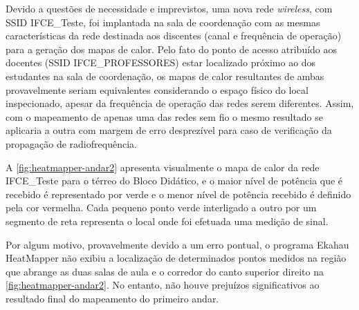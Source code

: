 Devido a questões de necessidade e imprevistos, uma nova rede \textit{wireless}, com SSID IFCE\_Teste, foi implantada na sala de coordenação com as mesmas características da rede destinada aos discentes (canal e frequência de operação) para a geração dos mapas de calor. Pelo fato do ponto de acesso atribuído aos docentes (SSID IFCE\_PROFESSORES) estar localizado próximo ao dos estudantes na sala de coordenação, os mapas de calor resultantes de ambas provavelmente seriam equivalentes considerando o espaço físico do local inspecionado, apesar da frequência de operação das redes serem diferentes. Assim,  com o mapeamento de apenas uma das redes sem fio o mesmo resultado se aplicaria a outra com margem de erro desprezível para caso de verificação da propagação de radiofrequência.

A \autoref{fig:heatmapper-andar2} apresenta visualmente o mapa de calor da rede IFCE\_Teste para o térreo do Bloco Didático, e o maior nível de potência que é recebido é representado por verde e o menor nível de potência recebido é definido pela cor vermelha. Cada pequeno ponto verde interligado a outro por um segmento de reta representa o local onde foi efetuada uma medição de sinal.

Por algum motivo, provavelmente devido a um erro pontual, o programa Ekahau HeatMapper não exibiu a localização de determinados pontos medidos na região que abrange as duas salas de aula e o corredor do canto superior direito na \autoref{fig:heatmapper-andar2}. No entanto, não houve prejuízos significativos ao resultado final do mapeamento do primeiro andar.

\newpage
\begin{figure}[H]
	\centering
\end{figure}


